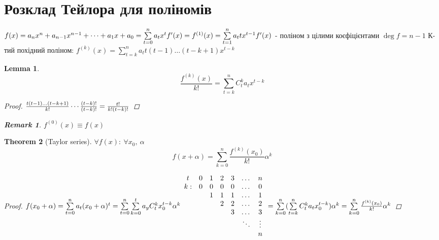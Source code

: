 \documentclass[a4paper,12pt, centered]{bookest}
\newtheorem{theorem}{Theorem}[section]
\newtheorem{lemma}[theorem]{Lemma}
\newtheorem*{remark*}{\emph{Remark}}
\begin{document}
\section{Розклад Тейлора для поліномів}
$f(x)=a_nx^n+a_{n-1}x^{n-1}+\dots+a_1x+a_0=\sum\limits_{t=0}^na_tx^t\\f'(x)=f^{(1)}(x)=\sum\limits_{t=1}^na_ttx^{t-1}\\f'(x)$ - поліном з цілими коєфіцієнтами $\deg f=n-1$
К-тий похідний поліном:
$f^{(k)}(x)=\sum\limits_{t=k}^na_tt(t-1)\dots(t-k+1)x^{t-k}$ 
\begin{lemma}
	$$\frac{f^{(k)}(x)}{k!}=\sum\limits_{t=k}^nC_t^ka_tx^{t-k}$$
	\begin{proof}
		$\\\frac{t(t-1)\dots(t-k+1)}{k!}\cdots\frac{(t-k)!}{(t-k)!}=\frac{t!}{k!(t-k)!}$
	\end{proof}
	\begin{remark*}
		$f^{(0)}(x)\equiv f(x)$
	\end{remark*}
\end{lemma}
\begin{theorem}[Taylor series]$\forall f(x):\>\forall x_0,\>\alpha$
	$$f(x+\alpha)=\sum\limits_{k=0}^{n}\frac{f^{(k)}(x_
	0)}{k!}\alpha^k$$
	\begin{proof}
		$\\f(x_0+\alpha)=\sum\limits_{t=0}^{n}a_t(x_0+\alpha)^t=\sum\limits_{t=0}^{n}\sum\limits_{k=0}^{t}a_yC_t^kx_0^{t-k}\alpha^k\\\begin{array}{ccccccc}
		t & 0 & 1 & 2 & 3 & \dots & n\\
		k: & 0 & 0 & 0 & 0 & \dots & 0\\
		 &  & 1 & 1 & 1 & \dots & 1\\
		  &  &  & 2 & 2 & \dots & 2\\
		   &  &  &  & 3 & \dots & 3\\
		   &  &  &  &  & \ddots & \vdots\\
		      &  &  &  &  & & n
			
		\end{array}\\=\sum\limits_{k=0}^{n}(\sum\limits_{t=k}^{n}C_t^ka_tx_0^{t-k})\alpha^k=\sum\limits_{k=0}^{n}\frac{f^{(k)}(x_0)}{k!}\alpha^k$
	\end{proof}
\end{theorem}
\end{document}
